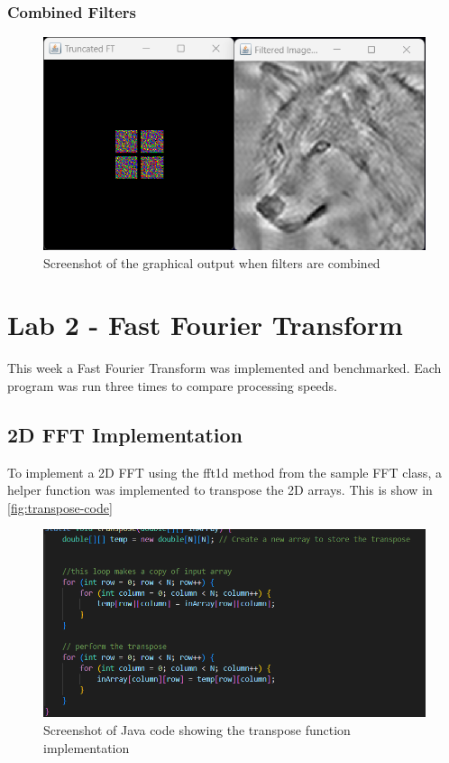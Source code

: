       \subsubsection{Combined Filters}
        \begin{figure}[H] 
            \centering
            \includegraphics[width=0.8\columnwidth]{Figures/Week 1/W1-Both-Filters.png}
            \caption{Screenshot of the graphical output when filters are combined}
            \label{fig:Combined-Filters}
        \end{figure}



\newpage
\section{Lab 2 - Fast Fourier Transform}
\newpage
This week a Fast Fourier Transform was implemented and benchmarked. Each program was run three times to compare processing speeds. 

\subsection{2D FFT Implementation}
To implement a 2D FFT using the fft1d method from the sample FFT class, a helper function was implemented to transpose the 2D arrays. This is show in \autoref{fig:transpose-code} 

    \begin{figure}[H] 
        \centering
        \includegraphics[width=0.8\columnwidth]{Figures/Week 2/Transpose Implementation.png}
        \caption{Screenshot of Java code showing the transpose function implementation}
        \label{fig:transpose-code}
    \end{figure}

